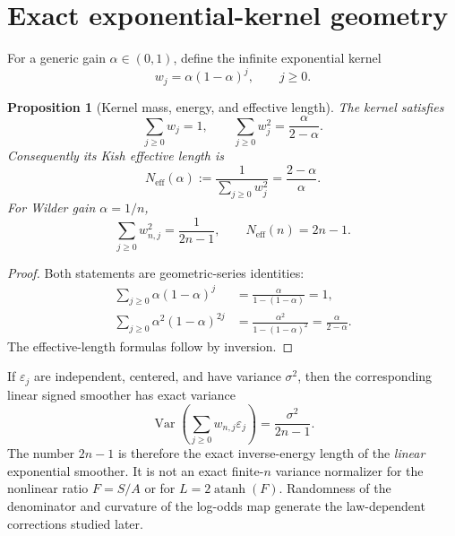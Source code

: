 \documentclass[11pt]{article}
\newtheorem{proposition}{Proposition}
\newcommand{\Var}{\operatorname{Var}}
\newcommand{\atanh}{\operatorname{atanh}}
\begin{document}
\section{Exact exponential-kernel geometry}
For a generic gain $\alpha\in(0,1)$, define the infinite exponential kernel
\begin{equation}
w_j=\alpha(1-\alpha)^j,\qquad j\ge0.
\end{equation}

\begin{proposition}[Kernel mass, energy, and effective length]
The kernel satisfies
\begin{equation}
\sum_{j\ge0}w_j=1,
\qquad
\sum_{j\ge0}w_j^2=\frac{\alpha}{2-\alpha}.
\end{equation}
Consequently its Kish effective length is
\begin{equation}
N_{\mathrm{eff}}(\alpha)
:=\frac{1}{\sum_{j\ge0}w_j^2}
=\frac{2-\alpha}{\alpha}.
\end{equation}
For Wilder gain $\alpha=1/n$,
\begin{equation}
\boxed{
\sum_{j\ge0}w_{n,j}^2=\frac{1}{2n-1},
\qquad
N_{\mathrm{eff}}(n)=2n-1.}
\end{equation}
\end{proposition}

\begin{proof}
Both statements are geometric-series identities:
\begin{align}
\sum_{j\ge0}\alpha(1-\alpha)^j
&=\frac{\alpha}{1-(1-\alpha)}=1,\\
\sum_{j\ge0}\alpha^2(1-\alpha)^{2j}
&=\frac{\alpha^2}{1-(1-\alpha)^2}
=\frac{\alpha}{2-\alpha}.
\end{align}
The effective-length formulas follow by inversion.
\end{proof}

If $\varepsilon_j$ are independent, centered, and have variance $\sigma^2$,
then the corresponding linear signed smoother has exact variance
\begin{equation}
\Var\!\left(\sum_{j\ge0}w_{n,j}\varepsilon_j\right)
=\frac{\sigma^2}{2n-1}.
\end{equation}
The number $2n-1$ is therefore the exact inverse-energy length of the
\emph{linear} exponential smoother.  It is not an exact finite-$n$ variance
normalizer for the nonlinear ratio $F=S/A$ or for $L=2\atanh(F)$.  Randomness
of the denominator and curvature of the log-odds map generate the
law-dependent corrections studied later.
\end{document}

